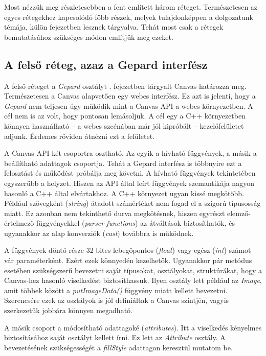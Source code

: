 \documentclass[12pt]{report}
\theoremstyle{definition}
\newcommand{\inenglish}[1]{\textsl{#1}}
\newcommand{\func}[1]{{\textsl{#1}}}
\begin{document}
Most nézzük meg részletesebben a fent említett három réteget. Természetesen az
egyes rétegekhez kapcsolódó főbb részek, melyek tulajdonképpen a dolgozatunk
témája, külön fejezetben lesznek tárgyalva. Tehát most csak a rétegek
bemutatásához szükséges módon említjük meg ezeket.

    \subsection*{A felső réteg, azaz a Gepard interfész}

A felső réteget a \func{Gepard} osztályt . fejezetben tárgyalt
Canvas határozza meg. Természetesen  a Canvas alapvetően egy webes interfész.
Ez azt is jelenti, hogy a \func{Gepard} nem teljesen úgy működik mint a Canvas
API a webes környezetben. A cél nem is az volt, hogy pontosan lemásoljuk. A cél
egy a C++ környezetben könnyen használható -- a webes szcénában már jól
kipróbált -- kezelőfelületet adjunk. Érdemes röviden átnézni ezt a felületet.

A Canvas API két csoportra osztható. Az egyik a hívható függvények, a másik a
beállítható adattagok csoportja. Tehát a Gepard interfész is többnyire ezt a
felosztást és működést próbálja meg követni. A hívható függvények tekintetében
egyszerűbb a helyzet. Hiszen az API által leírt függvények szemantikája nagyon
hasonló a C++ által elvártakhoz. A C++ környezet ugyan kissé megkötőbb. Például
szövegként (\inenglish{string}) átadott számértéket nem fogad el a szigorú
típusosság miatt. Ez azonban nem tekinthető durva megkötésnek, hiszen egyrészt
elemző-értelmező függvényekkel (\inenglish{parser functions}) az átváltások
biztosíthatók, és ugyanakkor az alap konverziók (\inenglish{cast}) továbbra is
működnek.

A függvények döntő része 32 bites lebegőpontos (\func{float}) vagy egész
(\func{int}) számot vár paraméterként. Ezért ezek könnyedén kezelhetők.
Ugyanakkor pár metódus esetében szükségszerű bevezetni saját típusokat,
osztályokat, struktúrákat, hogy a Canvas-hez hasonló viselkedést biztosíthassuk.
Ilyen osztály lett például az \func{Image}, amit többek között a
\func{putImageData()} függvény miatt kellett bevezetni. Szerencsére ezek az
osztályok is jól definiáltak a Canvas szintjén, vagyis szerkezetük jobbára
könnyen megadható.

A másik csoport a módosítható adattagoké (\inenglish{attributes}). Itt a
viselkedés kényelmes biztosításához saját osztályt kellett írni. Ez lett az
\func{Attribute} osztály. A bevezetésének szükségességét a \func{fillStyle}
adattagon keresztül mutatom be.
\end{document}
